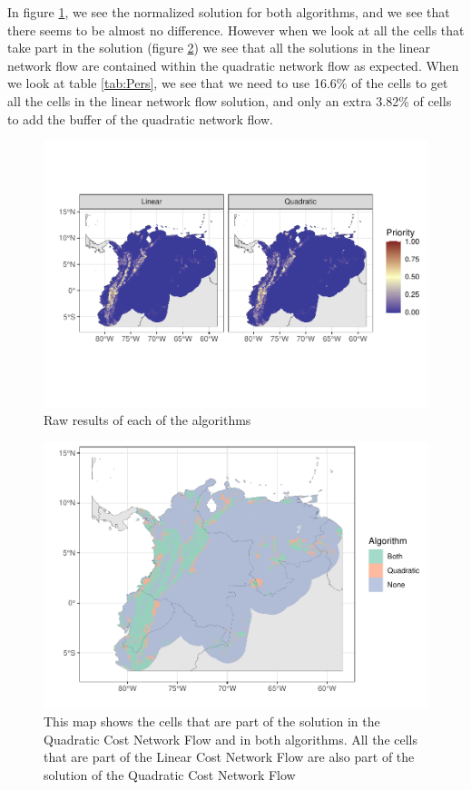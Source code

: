\documentclass[]{article}
\begin{document}
In figure \ref{fig:ComparisonSols}, we see the normalized solution for both algorithms, and we see that there seems to be almost no difference. However when we look at all the cells that take part in the solution (figure \ref{fig:Overlap}) we see that all the solutions in the linear network flow are contained within the quadratic network flow as expected. When we look at table \ref{tab:Pers}, we see that we need to use 16.6\% of the cells to get all the cells in the linear network flow solution, and only an extra 3.82\% of cells to add the buffer of the quadratic network flow.

\begin{figure}
\centering
\includegraphics{TagetBasedNew_files/figure-latex/ComparisonSols-1.pdf}
\caption{\label{fig:ComparisonSols}Raw results of each of the algorithms}
\end{figure}

\begin{figure}
\centering
\includegraphics{TagetBasedNew_files/figure-latex/Overlap-1.pdf}
\caption{\label{fig:Overlap}This map shows the cells that are part of the solution in the Quadratic Cost Network Flow and in both algorithms. All the cells that are part of the Linear Cost Network Flow are also part of the solution of the Quadratic Cost Network Flow}
\end{figure}
\end{document}

